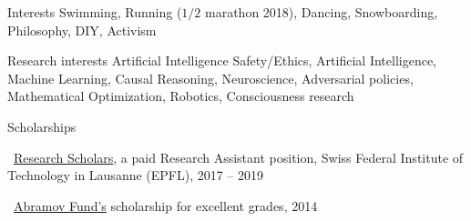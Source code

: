\documentclass{resume} %
\newcommand*{\mybold}[1]{{\color{gray} #1}}
\newcommand{\mylink}{{\color{gray}\faExternalLink}}
\begin{document}
\begin{rSection}{Interests}
	Swimming, Running ($1/2$ marathon 2018), Dancing, Snowboarding, Philosophy, DIY, Activism
\end{rSection}

\begin{rSection}{Research interests}
	Artificial Intelligence Safety/Ethics, Artificial Intelligence, Machine Learning, Causal Reasoning, Neuroscience, Adversarial policies, Mathematical Optimization, Robotics, Consciousness research %
\end{rSection}

\begin{rSection}{Scholarships}
	\vspace{-1em}
	\item \mylink~\href{https://www.epfl.ch/schools/ic/education/master/research-scholars/}{Research Scholars}, a paid \mybold{Research Assistant} position, Swiss Federal Institute of Technology in Lausanne (EPFL), 2017 -- 2019
	\item \mylink~\href{https://web.archive.org/web/20190730104204/http://phystech-foundation.org/}{Abramov Fund's} scholarship for excellent \mybold{grades,} 2014
\end{rSection}

\end{document}
